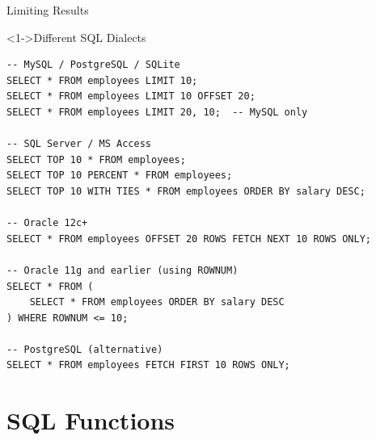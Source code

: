 \documentclass[aspectratio=169,11pt]{beamer}
\begin{document}
\begin{frame}[fragile]{Limiting Results}
\begin{block}<1->{Different SQL Dialects}
\begin{lstlisting}
-- MySQL / PostgreSQL / SQLite
SELECT * FROM employees LIMIT 10;
SELECT * FROM employees LIMIT 10 OFFSET 20;
SELECT * FROM employees LIMIT 20, 10;  -- MySQL only

-- SQL Server / MS Access
SELECT TOP 10 * FROM employees;
SELECT TOP 10 PERCENT * FROM employees;
SELECT TOP 10 WITH TIES * FROM employees ORDER BY salary DESC;

-- Oracle 12c+
SELECT * FROM employees OFFSET 20 ROWS FETCH NEXT 10 ROWS ONLY;

-- Oracle 11g and earlier (using ROWNUM)
SELECT * FROM (
    SELECT * FROM employees ORDER BY salary DESC
) WHERE ROWNUM <= 10;

-- PostgreSQL (alternative)
SELECT * FROM employees FETCH FIRST 10 ROWS ONLY;
\end{lstlisting}
\end{block}
\end{frame}

\section{SQL Functions}
\end{document}
